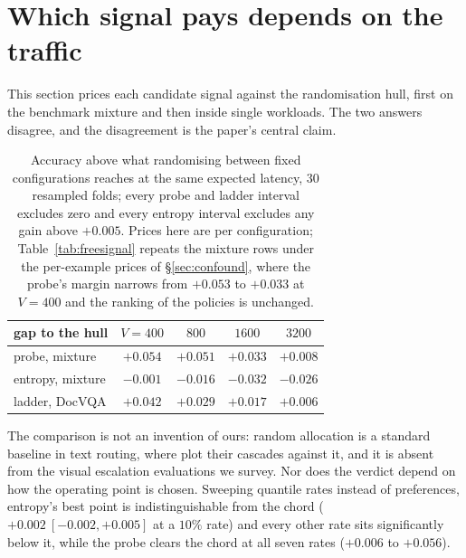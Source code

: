 \documentclass[10pt,twocolumn]{article}
\theoremstyle{plain}
\begin{document}
\section{Which signal pays depends on the traffic}
\label{sec:regimes}

This section prices each candidate signal against the randomisation hull,
first on the benchmark mixture and then inside single workloads. The two
answers disagree, and the disagreement is the paper's central claim.


\begin{table}[t]
\centering\small
\setlength{\tabcolsep}{4pt}
\begin{tabular}{lcccc}
\toprule
gap to the hull & $V{=}400$ & $800$ & $1600$ & $3200$ \\
\midrule
probe, mixture & $\mathbf{+0.054}$ & $+0.051$ & $+0.033$ & $+0.008$ \\
entropy, mixture & $-0.001$ & $-0.016$ & $\mathbf{-0.032}$ & $-0.026$ \\
ladder, DocVQA & $+0.042$ & $+0.029$ & $+0.017$ & $+0.006$ \\
\bottomrule
\end{tabular}
\caption{Accuracy above what randomising between fixed configurations reaches
at the same expected latency, $30$ resampled folds; every probe and ladder
interval excludes zero and every entropy interval excludes any gain above
$+0.005$. Prices here are per configuration;
Table~\ref{tab:freesignal} repeats the mixture rows under the per-example
prices of \S\ref{sec:confound}, where the probe's margin narrows from
$+0.053$ to $+0.033$ at $V{=}400$ and the ranking of the policies is
unchanged.}
\label{tab:convexity}
\end{table}

The comparison is not an invention of ours: random allocation is a standard
baseline in text routing, where \cite{lugoloobi} plot their cascades against
it, and it is absent from the visual escalation evaluations we survey. Nor does
the verdict depend on how the operating point is chosen. Sweeping quantile
rates instead of preferences, entropy's best point is indistinguishable from
the chord ($+0.002\ [-0.002, +0.005]$ at a $10\%$ rate) and every other rate
sits significantly below it, while the probe clears the chord at all seven
rates ($+0.006$ to $+0.056$).
\end{document}
